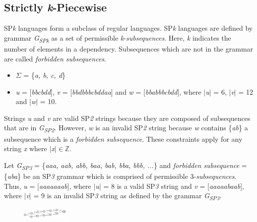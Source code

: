 \documentclass[a0,portrait]{a0poster}
\begin{document}
\begin{multicols}{2}
\subsection*{Strictly \emph{k}-Piecewise}

SP\emph{k} languages form a subclass of regular languages. SP\emph{k} languages are defined by grammar \emph{G}\textsubscript{\emph{SPk}} as a set of permissible \emph{k}-\emph{subsequences}. Here, \emph{k} indicates the number of elements in a dependency. Subsequences which are not in the grammar are called \emph{forbidden subsequences}.

\begin{itemize}
\item \( \Sigma \) = \{\emph{a, b, c, d}\} 
\item \emph{u} = [\emph{bbcbdd}], \emph{v} = [\emph{bbdbbbcbddaa}] and \emph{w} = [\emph{bbabbbcbdd}], where \( \vert \)\emph{u}\( \vert \) = 6, \( \vert \)\emph{v}\( \vert \) = 12 and \( \vert \)\emph{w}\( \vert \) = 10.
\end{itemize}
Strings \emph{u} and \emph{v} are valid SP\emph{2} strings because they are composed of subsequences that are in \emph{G\textsubscript{SP\emph{2}}}. However, \emph{w} is an invalid SP\emph{2} string because \emph{w} contains \{\emph{ab}\} a subsequence which is a \emph{forbidden subsequence}. These constraints apply for any string \emph{x} where \( \vert \)\emph{x}\( \vert \in \mathbb{Z} \).

Let \emph{G\textsubscript{SP\emph{3}}}  = \{\emph{aaa, aab, abb, baa, bab, bba, bbb, ...}\} and \emph{forbidden subsequence} = \{\emph{aba}\} be an SP\emph{3} grammar which is comprised of permissible $3$-\emph{subsequences}. Thus, \emph{u} = [\emph{aaaaaaab}], where \( \vert \)\emph{u}\( \vert \) = 8 is a valid SP\emph{3} string and \emph{v} = [\emph{aaaaabaab}], where \( \vert \)\emph{v}\( \vert \) = 9 is an invalid SP\emph{3} string as defined by the grammar \emph{G\textsubscript{SP\emph{3}}}.

\begin{figure}
\begin{center}
\includegraphics[width=0.2\textwidth]{fsa1.png}
\label{fig:fsa1}
\end{center}
\end{figure}


\end{multicols}
\end{document}
